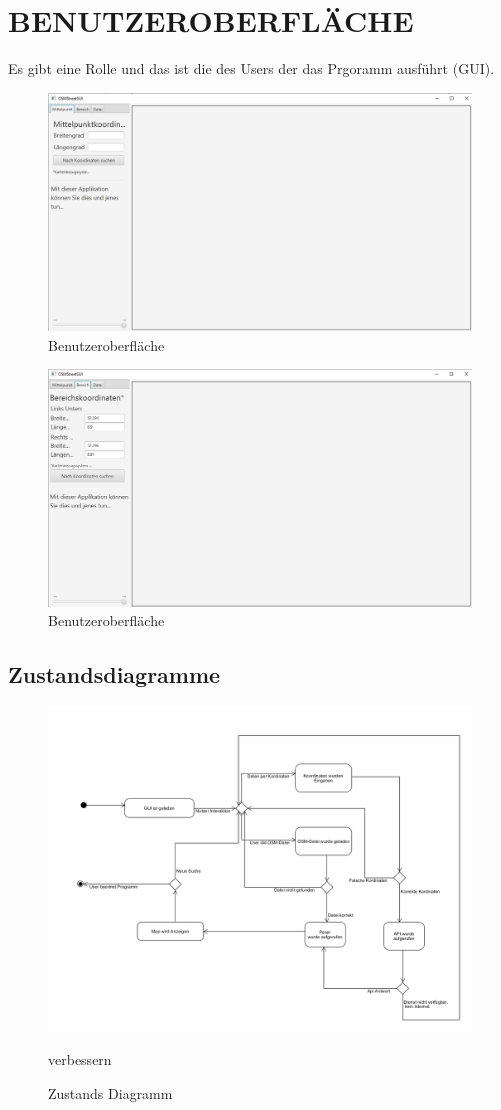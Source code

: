 	\section{\Large BENUTZEROBERFLÄCHE}
	Es gibt eine Rolle und das ist die des Users der das Prgoramm ausführt (GUI).
	\begin{figure}[H]
	\centering
	\includegraphics[width=0.7\linewidth]{images/OSMStreetView}
	\caption{Benutzeroberfläche}
	\label{fig:GUI}
	\end{figure}
	
	\begin{figure}[H]
	\centering
	\includegraphics[width=0.7\linewidth]{images/OSMStreetView2}
	\caption{Benutzeroberfläche}
	\label{fig:GUI2}
	\end{figure}
	
	\subsection{Zustandsdiagramme}
	\begin{figure}[H]
	\centering
	\includegraphics[width=0.7\linewidth]{images/Zustandsdiagramm}
	\caption{Zustands Diagramm}
	\label{fig:Zustands Diagramm}
	verbessern
	\end{figure}
	
